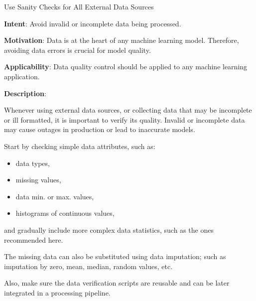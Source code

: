   
  \begin{frame}[plain]{ Use Sanity Checks for All External Data Sources
 }

  \textbf{Intent}: Avoid invalid or incomplete data being processed. 
 

  \textbf{Motivation}: Data is at the heart of any machine learning model. Therefore, avoiding data errors is crucial for model quality. 
 

  \textbf{Applicability}: Data quality control should be applied to any machine learning application. 
 

  \textbf{Description}: 

Whenever using external data sources, or collecting data that may be incomplete or ill formatted, it is important to verify its quality.
Invalid or incomplete data may cause outages in production or lead to inaccurate models.


Start by checking simple data attributes, such as:


\begin{itemize}

  \item data types,

  \item missing values,

  \item data min. or max. values,

  \item histograms of continuous values,

\end{itemize}


and gradually include more complex data statistics, such as the ones recommended here.


The missing data can also be substituted using data imputation; such as imputation by zero, mean, median, random values, etc.


Also, make sure the data verification scripts are reusable and can be later integrated in a processing pipeline.


 


  \end{frame}

